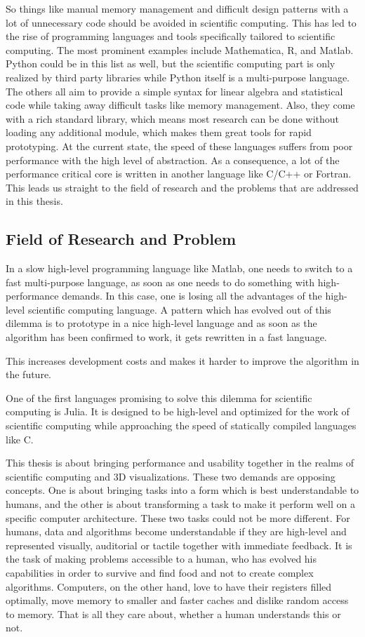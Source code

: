 So things like manual memory management and difficult design patterns with a lot of unnecessary code should be avoided in scientific computing.
This has led to the rise of programming languages and tools specifically tailored to scientific computing.
The most prominent examples include Mathematica, R, and Matlab. 
Python could be in this list as well, but the scientific computing part is only realized by third party libraries while Python itself is a multi-purpose language.
The others all aim to provide a simple syntax for linear algebra and statistical code while taking away difficult tasks like memory management. 
Also, they come with a rich standard library, which means most research can be done without loading any additional module, which makes them great tools for rapid prototyping.
At the current state, the speed of these languages suffers from poor performance with the high level of abstraction. 
As a consequence, a lot of the performance critical core is written in another language like C/C++ or Fortran. 
This leads us straight to the field of research and the problems that are addressed in this thesis.


\subsection{Field of Research and Problem}


In a slow high-level programming language like Matlab, one needs to switch to a fast multi-purpose language, as soon as one needs to do something with high-performance demands.
In this case, one is losing all the advantages of the high-level scientific computing language.
A pattern which has evolved out of this dilemma is to prototype in a nice high-level language and as soon as the algorithm has been confirmed to work, it gets rewritten in a fast language.

This increases development costs and makes it harder to improve the algorithm in the future.

One of the first languages promising to solve this dilemma for scientific computing is Julia. 
It is designed to be high-level and optimized for the work of scientific computing while approaching the speed of statically compiled languages like C.

This thesis is about bringing performance and usability together in the realms of scientific computing and 3D visualizations.
These two demands are opposing concepts. 
One is about bringing tasks into a form which is best understandable to humans, and the other is about transforming a task to make it perform well on a specific computer architecture.
These two tasks could not be more different. 
For humans, data and algorithms become understandable if they are high-level and represented visually, auditorial or tactile together with immediate feedback. 
It is the task of making problems accessible to a human, who has evolved his capabilities in order to survive and find food and not to create complex algorithms.
Computers, on the other hand, love to have their registers filled optimally, move memory to smaller and faster caches and dislike random access to memory. That is all they care about, whether a human understands this or not.

